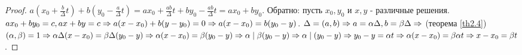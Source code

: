 \documentclass[a4paper, 12pt]{article}
\renewcommand{\div}{\mid}
\theoremstyle{definition}
\begin{document}
\begin{proof}
        $a(x_0+\frac{b}{\Delta}t)+b(y_0-\frac{a}{\Delta}t)=ax_0+\frac{ab}{\Delta}t+by_0-\frac{ab}{\Delta}t=ax_0+by_0$. Обратно: пусть $x_0,y_0$ и $x,y$ - различные решения. $ax_0+by_0=c, ax+by=c \\ \Rightarrow a(x-x_0)+b(y-y_0)=0\Rightarrow a(x-x_0)=b(y_0-y)$. $\Delta = (a,b) \\ \Rightarrow a=\alpha\Delta, b=\beta\Delta\Rightarrow$ (теорема \ref{th2.4}) $(\alpha,\beta)=1 \\ \Rightarrow \alpha\Delta(x-x_0)=\beta\Delta(y_0-y)\Rightarrow \alpha(x-x_0)=\beta(y_0-y) \\ \Rightarrow \alpha \div \beta(y_0-y)\Rightarrow \alpha \div (y_0-y)\Rightarrow y_0-y=\alpha t\Rightarrow \alpha (x-x_0)=\beta \alpha t\\ \Rightarrow x-x_0=\beta t$.
    \end{proof}
\end{document}
